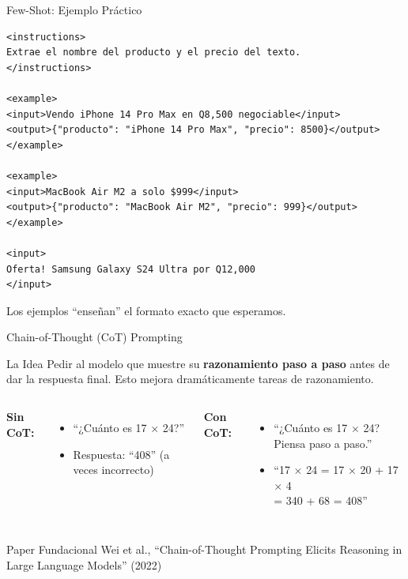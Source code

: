 \documentclass[aspectratio=169]{beamer}
\begin{document}
\begin{frame}[fragile]{Few-Shot: Ejemplo Práctico}
\begin{lstlisting}[style=xmlstyle]
<instructions>
Extrae el nombre del producto y el precio del texto.
</instructions>

<example>
<input>Vendo iPhone 14 Pro Max en Q8,500 negociable</input>
<output>{"producto": "iPhone 14 Pro Max", "precio": 8500}</output>
</example>

<example>
<input>MacBook Air M2 a solo $999</input>
<output>{"producto": "MacBook Air M2", "precio": 999}</output>
</example>

<input>
Oferta! Samsung Galaxy S24 Ultra por Q12,000
</input>
\end{lstlisting}

\vspace{0.2cm}
Los ejemplos ``enseñan'' el formato exacto que esperamos.
\end{frame}

\begin{frame}{Chain-of-Thought (CoT) Prompting}
    \begin{block}{La Idea}
        Pedir al modelo que muestre su \textbf{razonamiento paso a paso} antes de dar la respuesta final. Esto mejora dramáticamente tareas de razonamiento.
    \end{block}
    
    \vspace{0.3cm}
    \begin{columns}
        \textbf{Sin CoT:}
        \begin{itemize}
            \item ``¿Cuánto es 17 $\times$ 24?''
            \item Respuesta: ``408'' (a veces incorrecto)
        \end{itemize}
        
        \textbf{Con CoT:}
        \begin{itemize}
            \item ``¿Cuánto es 17 $\times$ 24? Piensa paso a paso.''
            \item ``17 $\times$ 24 = 17 $\times$ 20 + 17 $\times$ 4\\
                  = 340 + 68 = 408''
        \end{itemize}
    \end{columns}
    
    \vspace{0.4cm}
    \begin{exampleblock}{Paper Fundacional}
        Wei et al., ``Chain-of-Thought Prompting Elicits Reasoning in Large Language Models'' (2022)
    \end{exampleblock}
\end{frame}
\end{document}
